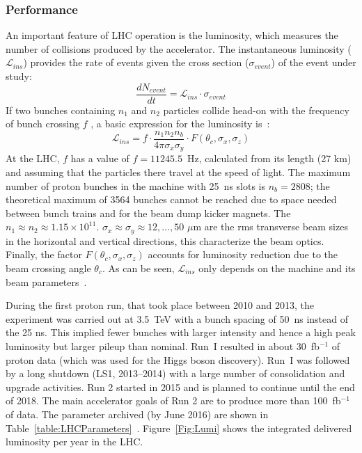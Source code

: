 \subsubsection*{Performance}
An important feature of LHC operation is the luminosity, which measures the number of collisions produced by the accelerator. The instantaneous luminosity ($\mathcal{L}_{ins}$) provides the rate of events given the cross section ($\sigma_{event}$) of the event under study:
\begin{equation*}
\frac{dN_{event}}{dt}=\mathcal{L}_{ins} \cdot \sigma_{event}
\end{equation*}
If two bunches containing $n_1$ and $n_2$ particles collide head-on with the frequency of bunch crossing $f$ , a basic expression for the luminosity is~\cite{Hoecker:2016vvy}:
\begin{equation*}
\mathcal{L}_{ins} = f \cdot \frac{n_1 n_2 n_b}{4\pi \sigma_x \sigma_y}\cdot F(\theta_c ,\sigma_x, \sigma_z)
\end{equation*}
At the LHC, $f$ has a value of $f=11 245.5$~Hz, calculated from its length (27 km) and assuming that the particles there travel at the speed of light. The maximum number of proton bunches in the machine with 25~ns slots is $n_b=2808$; the theoretical maximum of 3564 bunches cannot be reached due to space needed between bunch trains and for the beam dump kicker magnets. The $n_1 \approx n_2 \approx  1.15 \times 10 ^{11}$. $\sigma_x \approx \sigma_y  \approx 12,...,50$ $\mu$m are the rms transverse beam sizes in the horizontal and vertical directions, this characterize the beam optics. Finally, the factor $ F(\theta_c ,\sigma_x, \sigma_z)$ accounts for luminosity reduction due to the beam crossing angle $\theta_c$. As can be seen, $\mathcal{L}_{ins}$ only depends on the machine and its beam parameters~\cite{Olive:2016xmw}.

During the first proton run, that took place between 2010 and 2013, the experiment was carried out at 3.5~TeV with a bunch spacing of 50~ns instead of the 25 ns. This implied fewer bunches with larger intensity and hence a high peak luminosity but larger pileup than nominal. Run~I resulted in about 30~fb$^{-1}$ of proton data (which was used for the Higgs boson discovery). Run~I was followed by a long shutdown (LS1, 2013–2014) with a large number of consolidation and upgrade activities. Run 2 started in 2015 and is planned to continue until the end of 2018. The main accelerator goals of
Run 2 are to produce more than 100~fb$^{-1}$ of data. The parameter archived (by June 2016) are shown in Table~\ref{table:LHCParameters}~\cite{bruce2016lhc}. Figure~\ref{Fig:Lumi} shows the integrated delivered luminosity per year in the LHC.



